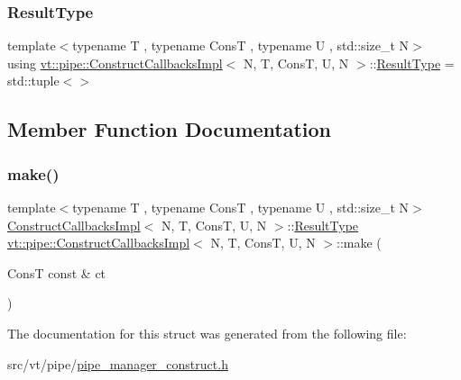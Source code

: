 \subsubsection{\texorpdfstring{Result\+Type}{ResultType}}
{\footnotesize\ttfamily template$<$typename T , typename ConsT , typename U , std\+::size\+\_\+t N$>$ \\
using \hyperlink{structvt_1_1pipe_1_1_construct_callbacks_impl}{vt\+::pipe\+::\+Construct\+Callbacks\+Impl}$<$ N, T, ConsT, U, N $>$\+::\hyperlink{structvt_1_1pipe_1_1_construct_callbacks_impl_3_01_n_00_01_t_00_01_cons_t_00_01_u_00_01_n_01_4_ae8850475c6b6387225345a76eb645fd5}{Result\+Type} =  std\+::tuple$<$$>$}



\subsection{Member Function Documentation}
\mbox{\label{structvt_1_1pipe_1_1_construct_callbacks_impl_3_01_n_00_01_t_00_01_cons_t_00_01_u_00_01_n_01_4_a40ef1f8dedef213f27c603452ff8df66}} 
\subsubsection{\texorpdfstring{make()}{make()}}
{\footnotesize\ttfamily template$<$typename T , typename ConsT , typename U , std\+::size\+\_\+t N$>$ \\
\hyperlink{structvt_1_1pipe_1_1_construct_callbacks_impl}{Construct\+Callbacks\+Impl}$<$ N, T, ConsT, U, N $>$\+::\hyperlink{structvt_1_1pipe_1_1_construct_callbacks_impl_3_01_n_00_01_t_00_01_cons_t_00_01_u_00_01_n_01_4_ae8850475c6b6387225345a76eb645fd5}{Result\+Type} \hyperlink{structvt_1_1pipe_1_1_construct_callbacks_impl}{vt\+::pipe\+::\+Construct\+Callbacks\+Impl}$<$ N, T, ConsT, U, N $>$\+::make (\begin{DoxyParamCaption}\item[{ConsT const \&}]{ct }\end{DoxyParamCaption})\hspace{0.3cm}{\ttfamily [static]}}



The documentation for this struct was generated from the following file\+:\begin{DoxyCompactItemize}
\item 
src/vt/pipe/\hyperlink{pipe__manager__construct_8h}{pipe\+\_\+manager\+\_\+construct.\+h}\end{DoxyCompactItemize}
